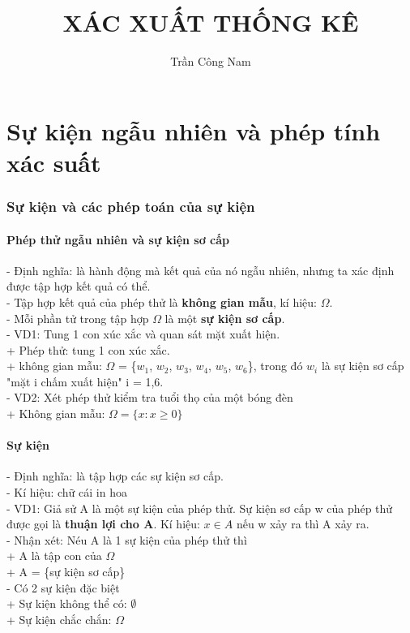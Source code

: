 \documentclass{article}
\title{XÁC XUẤT THỐNG KÊ}
\author{Trần Công Nam}
\begin{document}
\maketitle

\part{Sự kiện ngẫu nhiên và phép tính xác suất}

\section{Sự kiện và các phép toán của sự kiện}
\subsection{Phép thử ngẫu nhiên và sự kiện sơ cấp}
- Định nghĩa: là hành động mà kết quả của nó ngẫu nhiên, nhưng ta xác định được tập hợp kết quả có thể.\\
- Tập hợp kết quả của phép thử là \textbf{không gian mẫu}, kí hiệu: $\Omega$.\\
- Mỗi phần tử trong tập hợp $\Omega$ là một \textbf{sự kiện sơ cấp}.\\
- VD1: Tung 1 con xúc xắc và quan sát mặt xuất hiện.\\
+ Phép thử: tung 1 con xúc xắc.\\
+ không gian mẫu: $\Omega$ = \{$w_1$, $w_2$, $w_3$, $w_4$, $w_5$, $w_6$\}, trong đó $w_i$ là sự kiện sơ cấp "mặt i chấm xuất hiện" i = 1,6.\\
- VD2: Xét phép thử kiểm tra tuổi thọ của một bóng đèn\\
+ Không gian mẫu: $\Omega=\{x: x\geq 0\}$\\

\subsection{Sự kiện}
- Định nghĩa: là tập hợp các sự kiện sơ cấp.\\
- Kí hiệu: chữ cái in hoa \\
- VD1: Giả sử A là một sự kiện của phép thử. Sự kiện sơ cấp w của phép thử được gọi là \textbf{thuận lợi cho A}. Kí hiệu: $x \in A$ nếu w xảy ra thì A xảy ra.\\
- Nhận xét: Néu A là 1 sự kiện của phép thử thì\\
+ A là tập con của $\Omega$ \\
+ A = \{sự kiện sơ cấp\} \\
- Có 2 sự kiện đặc biệt \\
+ Sự kiện không thể có: $\emptyset$ \\
+ Sự kiện chắc chắn: $\Omega$ \\
\end{document}
